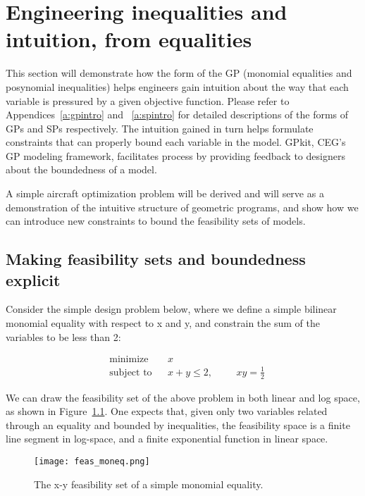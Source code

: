\chapter{Engineering inequalities and intuition, from equalities}
\label{ch2:inequalities}

This section will demonstrate how the form of the \gls{GP} (monomial
equalities and posynomial inequalities) helps engineers gain intuition
about the way that each variable is pressured
by a given objective function. Please refer to Appendices~\ref{a:gpintro} and ~\ref{a:spintro}
for detailed descriptions of the forms of \gls{GP}s and \gls{SP}s respectively.
The intuition gained in turn helps formulate
constraints that can properly bound each variable in the model.
GPkit, \gls{CEG}'s \gls{GP} modeling framework,
facilitates process by providing feedback to designers about
the boundedness of a model.

A simple aircraft optimization problem will be derived and will serve as
a demonstration of the intuitive structure of geometric programs, and show
how we can introduce new constraints to bound the feasibility sets of models.

\section{Making feasibility sets and boundedness explicit}

Consider the simple design problem below, where we define a simple bilinear
monomial equality with respect to x and y, and constrain the sum of the variables
to be less than 2:

\begin{equation*}
\begin{aligned}
& {\text{minimize}}
& & x \\
& \text{subject to}
& & x + y \leq 2,
    & & & xy = \frac{1}{2} \label{simple_moneq}
\end{aligned}
\end{equation*}

We can draw the feasibility set of the above problem in both linear and log space,
as shown in Figure~\ref{f:feas_moneq}. One expects that, given only two variables
related through an equality and bounded by inequalities, the feasibility space is
a finite line segment in log-space, and a finite exponential function in linear space.

\begin{figure}
    \centering
    \texttt{[image: feas\_moneq.png]}
    \caption{The x-y feasibility set of a simple monomial equality.}
    \label{f:feas_moneq}
\end{figure}

